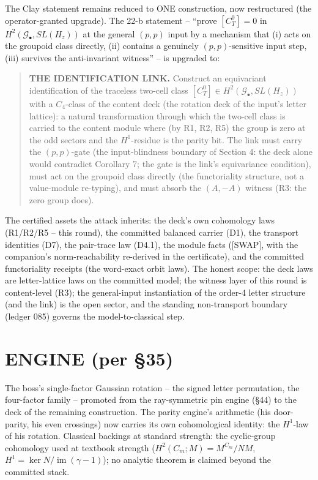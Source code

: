 \documentclass[11pt]{article}
\begin{document}
The Clay statement remains reduced to ONE construction, now
restructured (the operator-granted upgrade). The 22-b statement --
``prove $[C_T^0]=0$ in $H^2(\mathcal G_\bullet,SL(H_z))$ at the general
$(p,p)$ input by a mechanism that (i) acts on the groupoid class
directly, (ii) contains a genuinely $(p,p)$-sensitive input step, (iii)
survives the anti-invariant witness'' -- is upgraded to:

\begin{quote}
\textbf{THE IDENTIFICATION LINK.} Construct an equivariant
identification of the traceless two-cell class
$[C_T^0]\in H^2(\mathcal G_\bullet,SL(H_z))$ with a $C_4$-class of the
content deck (the rotation deck of the input's letter lattice): a
natural transformation through which the two-cell class is carried to
the content module where (by R1, R2, R5) the group is zero at the odd
sectors and the $H^1$-residue is the parity bit. The link must carry
the $(p,p)$-gate (the input-blindness boundary of Section 4: the deck
alone would contradict Corollary 7; the gate is the link's equivariance
condition), must act on the groupoid class directly (the functoriality
structure, not a value-module re-typing), and must absorb the
$(A,-A)$ witness (R3: the zero group does).
\end{quote}

The certified assets the attack inherits: the deck's own cohomology laws
(R1/R2/R5 -- this round), the committed balanced carrier (D1), the
transport identities (D7), the pair-trace law (D4.1), the module facts
([SWAP], with the companion's norm-reachability re-derived in the
certificate), and the committed functoriality receipts (the word-exact
orbit laws). The honest scope: the deck laws are letter-lattice laws on
the committed model; the witness layer of this round is content-level
(R3); the general-input instantiation of the order-4 letter structure
(and the link) is the open sector, and the standing non-transport
boundary (ledger 085) governs the model-to-classical step.

\section*{ENGINE (per §35)}

The boss's single-factor Gaussian rotation -- the signed letter
permutation, the four-factor family -- promoted from the ray-symmetric
pin engine (§44) to the deck of the remaining construction. The parity
engine's arithmetic (his door-parity, his even crossings) now carries
its own cohomological identity: the $H^1$-law of his rotation. Classical
backings at standard strength: the cyclic-group cohomology used at
textbook strength ($H^2(C_m;M)=M^{C_m}/NM$, $H^1=\ker N/\operatorname{im}
(\gamma-1)$); no analytic theorem is claimed beyond the committed stack.
\end{document}
